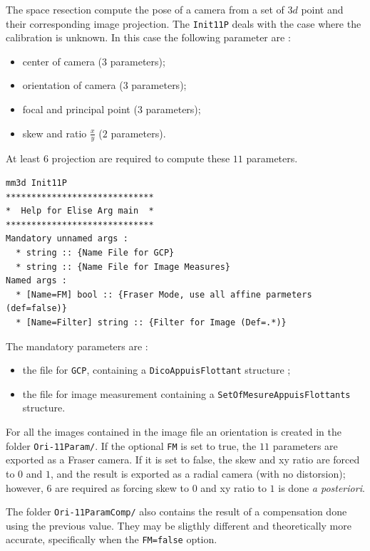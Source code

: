 The space resection compute the pose of a camera from a set of $3d$ point and their corresponding
image projection. The {\tt Init11P} deals with the case where the calibration is unknown. In this case the
following parameter are :


\begin {itemize}
    \item center of camera ($3$ parameters);
    \item orientation of camera ($3$ parameters);
    \item focal and principal point ($3$ parameters);
    \item skew and ratio $\frac xy$ ($2$ parameters).
\end {itemize}

At least $6$ projection are required to compute these $11$ parameters. 



\begin{verbatim}
mm3d Init11P
*****************************
*  Help for Elise Arg main  *
*****************************
Mandatory unnamed args : 
  * string :: {Name File for GCP}
  * string :: {Name File for Image Measures}
Named args : 
  * [Name=FM] bool :: {Fraser Mode, use all affine parmeters (def=false)}
  * [Name=Filter] string :: {Filter for Image (Def=.*)}
\end{verbatim}

The mandatory parameters are :

\begin {itemize}
  \item the file for {\tt GCP}, containing a {\tt DicoAppuisFlottant} structure ;
  \item the file for image measurement containing a {\tt SetOfMesureAppuisFlottants} structure.
\end {itemize}

For all the images contained in the image file an orientation is created in the folder {\tt Ori-11Param/}.
If the optional {\tt FM} is set to true, the $11$ parameters are exported as a Fraser camera. If it is
set to false, the skew and xy ratio are forced to $0$ and $1$, and the result is exported as a radial camera (with
no distorsion); however, $6$ are required as forcing skew to $0$ and xy ratio to $1$ is done
\emph{a posteriori}. 

The folder {\tt Ori-11ParamComp/} also contains the result of a compensation done using the previous value.
They may be sligthly different and theoretically more accurate, specifically when the {\tt FM=false} option.


